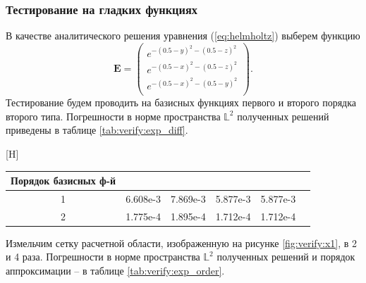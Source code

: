 \documentclass[a4paper,14pt]{article}
\makeatletter
\renewenvironment{table}[1][\fps@table]{
  \edef\@tempa{\noexpand\@float{table}[#1]}
  \@tempa
  \addtocounter{footable}{1}
}{
  \end@float
}
\makeatother
\begin{document}

\subsubsection{Тестирование на гладких функциях}

В качестве аналитического решения уравнения (\ref{eq:helmholtz}) выберем функцию
\begin{equation}
	\mathbf{E} = \left( \begin{array}{c}
		e^{-(0.5-y)^2 -(0.5-z)^2} \\
		e^{-(0.5-x)^2 -(0.5-z)^2} \\
		e^{-(0.5-x)^2 -(0.5-y)^2} \\
	\end{array} \right) .
	\label{eq:verify:exp_solution}
\end{equation}
Тестирование будем проводить на базисных функциях первого и второго порядка второго типа. Погрешности в норме пространства $\mathbb{L}^2$ полученных решений приведены в таблице \ref{tab:verify:exp_diff}.

\begin{table}[H]
	\caption{относительные погрешности в норме $\mathbb{L}^2$}
	\label{tab:verify:exp_diff}
	\begin{tabularx}{\textwidth}{|C{1}|C{1}|C{1}|C{1}|C{1}|C{1}|}
		\hline Порядок базисных ф-й &  &  &  &  \\
		 & 6.608e-3 & 7.869e-3 & 5.877e-3 & 5.877e-3 \\
		 & 1.775e-4 & 1.895e-4 & 1.712e-4 & 1.712e-4 \\
		\hline
	\end{tabularx}
\end{table}
\vspace{-0.5cm}

Измельчим сетку расчетной области, изображенную на рисунке \ref{fig:verify:x1}, в 2 и 4 раза. Погрешности в норме пространства $\mathbb{L}^2$ полученных решений и порядок аппроксимации -- в таблице \ref{tab:verify:exp_order}.
\end{document}
